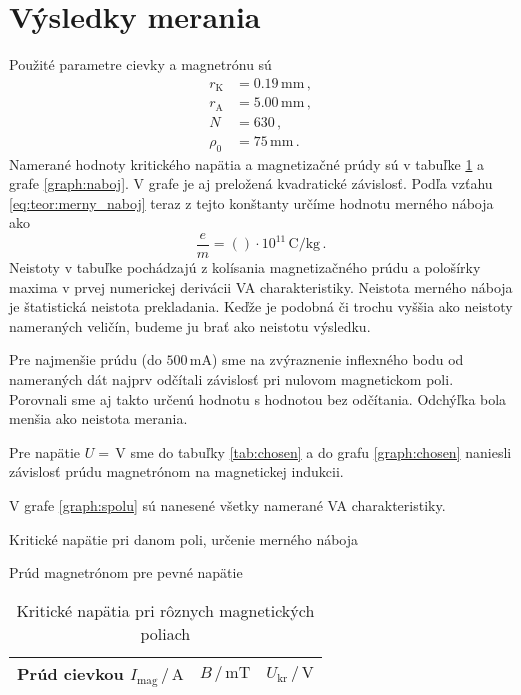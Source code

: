 \documentclass[a4paper, 10pt]{article}
\newcommand{\unit}[1]{\ensuremath{\, \mathrm{#1}}}
\newcommand{\di}[1]{\ensuremath{_\mathrm{#1}}}
\begin{document}
\section*{Výsledky merania}
Použité parametre cievky a magnetrónu sú
\begin{align*}
r\di K &= 0.19\unit{mm}\,,\\
r\di A &= 5.00\unit{mm}\,,\\
N &= 630\,,\\
\rho_0 &= 75\unit{mm}\,.
\end{align*}
Namerané hodnoty kritického napätia a magnetizačné prúdy sú v tabuľke \ref{tab:napatie} a grafe \ref{graph:naboj}. V grafe je aj preložená kvadratické závislosť. Podľa vzťahu \ref{eq:teor:merny_naboj} teraz z tejto konštanty určíme hodnotu merného náboja ako 
$$
\frac{e}{m} = ( )\cdot 10^{11} \unit{C/kg}\,.
$$
Neistoty v tabuľke pochádzajú z kolísania magnetizačného prúdu a pološírky maxima v prvej numerickej derivácii VA charakteristiky. Neistota merného náboja je štatistická neistota prekladania. Keďže je podobná či trochu vyššia ako neistoty nameraných veličín, budeme ju brať ako neistotu výsledku.

Pre najmenšie prúdu (do $500\unit{mA}$) sme na zvýraznenie inflexného bodu od nameraných dát najprv odčítali závislosť pri nulovom magnetickom poli. Porovnali sme aj takto určenú hodnotu s hodnotou bez odčítania. Odchýľka bola menšia ako neistota merania.

Pre napätie $U=  \unit V$ sme do tabuľky \ref{tab:chosen} a do grafu \ref{graph:chosen} naniesli závislosť prúdu magnetrónom na magnetickej indukcii. 

V grafe \ref{graph:spolu} sú nanesené všetky namerané VA charakteristiky.

\begin{graph}[t]
\centering
\vspace*{-15pt}

\caption{ Kritické napätie pri danom poli, určenie merného náboja \label{graph:naboj}}
\end{graph}

\begin{graph}[t]
\centering
\vspace*{-15pt}

\caption{ Prúd magnetrónom pre pevné napätie }
 \label{graph:chosen}
\end{graph}

\begin{table}[t]
\centering
\hspace*{30pt}
\begin{tabular}{c|c|c}
Prúd cievkou $ I\di{mag}\,/\unit{A} $ & 
$ B\,/\unit{mT} $& 
$ U\di{kr}\,/\unit{V}$ 
\\
\midrule 

\end{tabular}
\newline
\vspace*{2pt}
\caption{Kritické napätia pri rôznych magnetických poliach\label{tab:napatie}}
\end{table}
\end{document}
